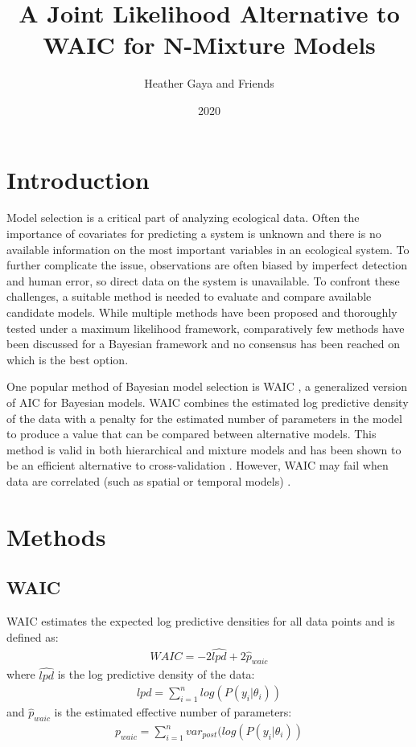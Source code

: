 \documentclass[12pt]{article}
\title{A Joint Likelihood Alternative to WAIC for N-Mixture Models}
\author{Heather Gaya and Friends}
\date{2020}
\begin{document}
\maketitle

\section{Introduction}

Model selection is a critical part of analyzing ecological data. Often the importance of covariates for predicting a system is unknown and there is no available information on the most important variables in an ecological system. To further complicate the issue, observations are often biased by imperfect detection and human error, so direct data on the system is unavailable. To confront these challenges, a suitable method is needed to evaluate and compare available candidate models. While multiple methods have been proposed and thoroughly tested under a maximum likelihood framework, comparatively few methods have been discussed for a Bayesian framework and no consensus has been reached on which is the best option. 

One popular method of Bayesian model selection is 	WAIC \citep{Watanabe_2010}, a generalized version of AIC for Bayesian models. WAIC combines the estimated log predictive density of the data with a penalty for the estimated number of parameters in the model to produce a value that can be compared between alternative models. This method is valid in both hierarchical and mixture models \citep{Watanabe_2010} and has been shown to be an efficient alternative to cross-validation \citep{Gelman_2014}. However, WAIC may fail when data are correlated (such as spatial or temporal models) \citep{Hooten_2015, Link_2020}. 


\section{Methods}

\subsection{WAIC}
 WAIC \citep{Watanabe_2010} estimates the expected log predictive densities for all data points and is defined as:
 \begin{gather*}
 WAIC = -2\widehat{lpd} + 2\widehat{p}_{waic}
 \end{gather*}
 where $\widehat{lpd}$ is the log predictive density of the data:
   \begin{gather*}
  lpd = \sum_{i = 1}^{n} log(P(y_i | \theta_i))
  \end{gather*}
  and $\widehat{p}_{waic}$ is the estimated effective number of parameters:
    \begin{gather*}
  p_{waic} = \sum_{i = 1}^{n} var_{post}(log(P(y_i | \theta_i))
  \end{gather*} 
 
\end{document}
